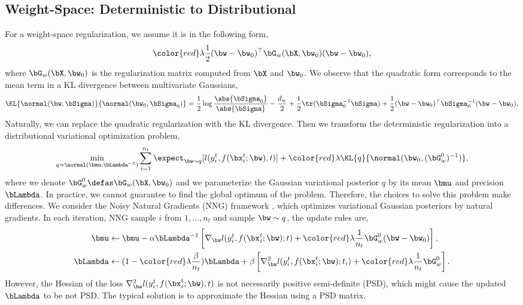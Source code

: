 \subsection{Weight-Space: Deterministic to Distributional}\label{subsec:dete-to-dist}
For a weight-space regularization, we assume it is in the following form,
\begin{align}
 {\color{red}\lambda}\frac{1}{2}(\bw - \bw_0)^{\top} \bG_{w}(\bX, \bw_0) (\bw - \bw_0),
\end{align}
where $\bG_{w}(\bX, \bw_0)$ is the regularization matrix computed from $\bX$ and $\bw_0$. We observe that the quadratic form corresponds to the mean term in a KL divergence between multivariate Gaussians,
\begin{align}
    \KL{\normal(\bw, \bSigma)}{\normal(\bw_0, \bSigma_0)} = \frac{1}{2}\log \frac{\abs{\bSigma_0}}{\abs{\bSigma}} - \frac{d_{w}}{2} + \frac{1}{2}\tr(\bSigma_0^{-1}\bSigma) + \frac{1}{2}(\bw - \bw_0)^{\top} \bSigma_0^{-1} (\bw-\bw_0), \notag
\end{align}
Naturally, we can replace the quadratic regularization with the KL divergence. Then we transform the deterministic regularization into a distributional variational optimization problem,
\begin{align}
    \min_{q = \normal(\bmu, \bLambda^{-1})} \sum_{i=1}^{n_t} \expect_{\bw \sim q}[l(y_i^t, f(\bx_i^t; \bw), t)] + {\color{red}\lambda} \KL{q}{\normal(\bw_0, (\bG_{w}^0)^{-1})},
\end{align}
where we denote $\bG_{w}^0 \defas \bG_{w}(\bX, \bw_0)$ and we parameterize the Gaussian variational posterior $q$ by its mean $\bmu$ and precision $\bLambda$. In practice, we cannot guarantee to find the global optimum of the problem. Therefore, the choices to solve this problem make differences. We consider the Noisy Natural Gradients (NNG) framework \citep{zhang2017noisy}, which optimizes variational Gaussian posteriors by natural gradients.  In each iteration, NNG sample $i$ from $1,...,n_t$ and sample $\bw \sim q$, the update rules are,
\begin{align}
    \bmu &\leftarrow \bmu - \alpha \bLambda^{-1}\left[\nabla_{\bw} l(y_i^t, f(\bx_i^t; \bw); t) + {\color{red}\lambda}\frac{1}{n_t} \bG_{w}^0 (\bw - \bw_0) \right], \\
     \bLambda &\leftarrow  (1 - {\color{red}\lambda}\frac{\beta}{n_t}) \bLambda + \beta\left[\nabla_{\bw}^2 l(y_i^t, f(\bx_i^t; \bw); t_i) + {\color{red}\lambda}\frac{1} {n_t} \bG_{w}^0 \right].
\end{align}
However, the Hessian of the loss $\nabla_{\bw}^2 l(y_i^t, f(\bx_i^t; \bw), t)$ is not necessarily positive semi-definite (PSD), which might cause the updated $\bLambda$ to be not PSD. The typical solution is to approximate the Hessian using a PSD matrix. 
